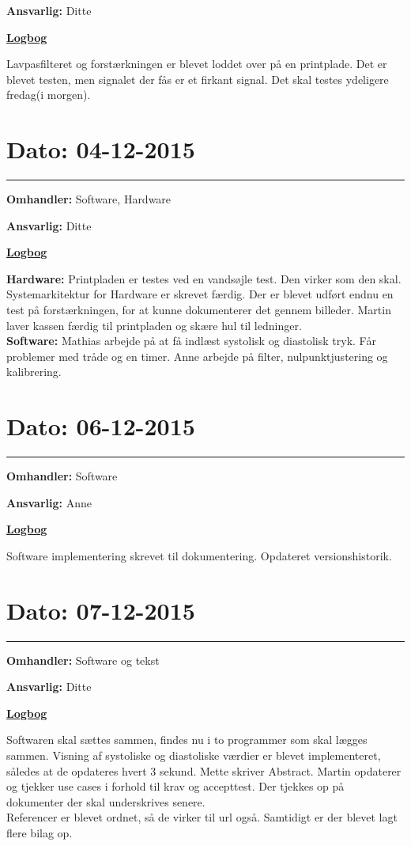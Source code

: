 \textbf{Ansvarlig:} Ditte  

\underline{\textbf{Logbog}}

Lavpasfilteret og forstærkningen er blevet loddet over på en printplade. Det er blevet testen, men signalet der fås er et firkant signal. Det skal testes ydeligere fredag(i morgen).  
\\

\section{Dato: 04-12-2015}
\hrule
\textbf{Omhandler:} Software, Hardware

\textbf{Ansvarlig:} Ditte  

\underline{\textbf{Logbog}}


\textbf{Hardware: }Printpladen er testes ved en vandsøjle test. Den virker som den skal. Systemarkitektur for Hardware er skrevet færdig. Der er blevet udført endnu en test på forstærkningen, for at kunne dokumenterer det gennem billeder. Martin laver kassen færdig til printpladen og skære hul til ledninger. \\
\textbf{Software: }Mathias arbejde på at få indlæst systolisk og diastolisk tryk. Får problemer med tråde og en timer. Anne arbejde på filter, nulpunktjustering og kalibrering.    
\newpage
\section{Dato: 06-12-2015}
\hrule
\textbf{Omhandler:} Software

\textbf{Ansvarlig:} Anne 

\underline{\textbf{Logbog}}

Software implementering skrevet til dokumentering. Opdateret versionshistorik.   
\\

\section{Dato: 07-12-2015}
\hrule
\textbf{Omhandler:} Software og tekst

\textbf{Ansvarlig:} Ditte 

\underline{\textbf{Logbog}}

Softwaren skal sættes sammen, findes nu i to programmer som skal lægges sammen. Visning af systoliske og diastoliske værdier er blevet implementeret, således at de opdateres hvert 3 sekund. 
Mette skriver Abstract. 
Martin opdaterer og tjekker use cases i forhold til krav og accepttest. Der tjekkes op på dokumenter der skal underskrives senere. \\Referencer er blevet ordnet, så de virker til url også. Samtidigt er der blevet lagt flere bilag op.  
\\


